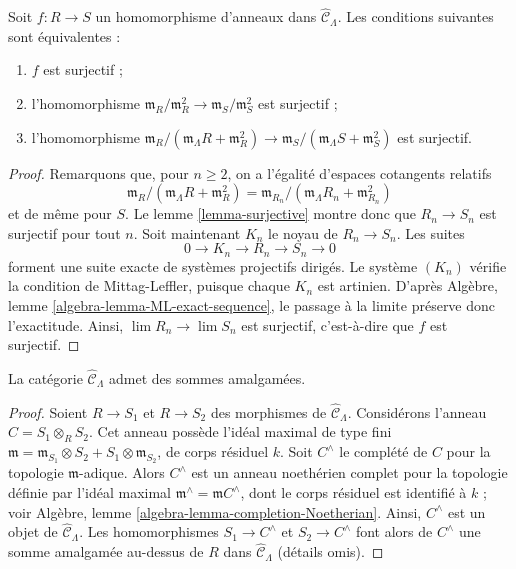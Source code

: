 \begin{lemma}
\label{lemma-surjective-cotangent-space}
Soit $f: R \to S$ un homomorphisme d'anneaux dans
$\widehat{\mathcal{C}}_\Lambda$. Les conditions suivantes sont équivalentes :
\begin{enumerate}
\item $f$ est surjectif ;
\item l'homomorphisme
$\mathfrak m_R/\mathfrak m_R^2 \to \mathfrak m_S/\mathfrak m_S^2$
est surjectif ;
\item l'homomorphisme
$\mathfrak m_R/(\mathfrak m_\Lambda R + \mathfrak m_R^2) \to
\mathfrak m_S/(\mathfrak m_\Lambda S + \mathfrak m_S^2)$
est surjectif.
\end{enumerate}
\end{lemma}

\begin{proof}
Remarquons que, pour $n \geq 2$, on a l'égalité d'espaces cotangents relatifs
$$
\mathfrak m_R/(\mathfrak m_\Lambda R + \mathfrak m_R^2)
=
\mathfrak m_{R_n}/(\mathfrak m_\Lambda R_n + \mathfrak m_{R_n}^2)
$$
et de même pour $S$. Le lemme \ref{lemma-surjective} montre donc que
$R_n \to S_n$ est surjectif pour tout $n$.
Soit maintenant $K_n$ le noyau de $R_n \to S_n$. Les suites
$$
0 \to K_n \to R_n \to S_n \to 0
$$
forment une suite exacte de systèmes projectifs dirigés. Le système $(K_n)$
vérifie la condition de Mittag-Leffler, puisque chaque $K_n$ est artinien.
D'après Algèbre, lemme \ref{algebra-lemma-ML-exact-sequence}, le passage à la
limite préserve donc l'exactitude. Ainsi,
$\lim R_n \to \lim S_n$ est surjectif, c'est-à-dire que $f$ est surjectif.
\end{proof}

\begin{lemma}
\label{lemma-CLambdahat-pushouts}
La catégorie $\widehat{\mathcal{C}}_\Lambda$ admet des sommes amalgamées.
\end{lemma}

\begin{proof}
Soient $R \to S_1$ et $R \to S_2$ des morphismes de
$\widehat{\mathcal{C}}_\Lambda$. Considérons l'anneau
$C = S_1 \otimes_R S_2$. Cet anneau possède l'idéal maximal de type fini
$\mathfrak m = \mathfrak m_{S_1} \otimes S_2 +
S_1 \otimes \mathfrak m_{S_2}$, de corps résiduel $k$.
Soit $C^\wedge$ le complété de $C$ pour la topologie $\mathfrak m$-adique.
Alors $C^\wedge$ est un anneau noethérien complet pour la topologie définie
par l'idéal maximal $\mathfrak m^\wedge = \mathfrak mC^\wedge$, dont le corps
résiduel est identifié à $k$ ; voir Algèbre, lemme
\ref{algebra-lemma-completion-Noetherian}. Ainsi, $C^\wedge$ est un objet de
$\widehat{\mathcal{C}}_\Lambda$. Les homomorphismes
$S_1 \to C^\wedge$ et $S_2 \to C^\wedge$ font alors de $C^\wedge$ une somme
amalgamée au-dessus de $R$ dans $\widehat{\mathcal{C}}_\Lambda$ (détails omis).
\end{proof}

